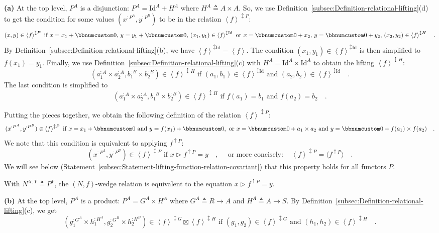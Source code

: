 \textbf{(a)} At the top level, $P^{A}$ is a disjunction: $P^{A}=\text{Id}^{A}+H^{A}$
where $H^{A}\triangleq A\times A$. So, we use Definition~\ref{subsec:Definition-relational-lifting}(d)
to get the condition for some values $(x^{:P^{A}},y^{:P^{B}})$ to
be in the relation $\left<f\right>^{\updownarrow P}$:
\[
(x,y)\in\left<f\right>^{\updownarrow P}\text{ if }x=x_{1}+\bbnum 0,\,y=y_{1}+\bbnum 0,\,(x_{1},y_{1})\in\left<f\right>^{\updownarrow\text{Id}}\text{ or }x=\bbnum 0+x_{2},\,y=\bbnum 0+y_{2},\,(x_{2},y_{2})\in\left<f\right>^{\updownarrow H}\quad.
\]
By Definition~\ref{subsec:Definition-relational-lifting}(b), we
have $\left<f\right>^{\updownarrow\text{Id}}=\left<f\right>$. The
condition $(x_{1},y_{1})\in\left<f\right>^{\updownarrow\text{Id}}$
is then simplified to $f(x_{1})=y_{1}$. Finally, we use Definition~\ref{subsec:Definition-relational-lifting}(c)
with $H^{A}=\text{Id}^{A}\times\text{Id}^{A}$ to obtain the lifting
$\left<f\right>^{\updownarrow H}$:
\[
(a_{1}^{:A}\times a_{2}^{:A},b_{1}^{:B}\times b_{2}^{:B})\in\left<f\right>^{\updownarrow H}\text{ if }(a_{1},b_{1})\in\left<f\right>^{\updownarrow\text{Id}}\text{ and }(a_{2},b_{2})\in\left<f\right>^{\updownarrow\text{Id}}\quad.
\]
The last condition is simplified to
\[
(a_{1}^{:A}\times a_{2}^{:A},b_{1}^{:B}\times b_{2}^{:B})\in\left<f\right>^{\updownarrow H}\text{ if }f(a_{1})=b_{1}\text{ and }f(a_{2})=b_{2}\quad.
\]

Putting the pieces together, we obtain the following definition of
the relation $\left<f\right>^{\updownarrow P}$:
\[
(x^{:P^{A}},y^{:P^{B}})\in\left<f\right>^{\updownarrow P}\text{ if }x=x_{1}+\bbnum 0\text{ and }y=f(x_{1})+\bbnum 0,\text{ or }x=\bbnum 0+a_{1}\times a_{2}\text{ and }y=\bbnum 0+f(a_{1})\times f(a_{2})\quad.
\]
We note that this condition is equivalent to applying $f^{\uparrow P}$:
\[
(x^{:P^{A}},y^{:P^{B}})\in\left<f\right>^{\updownarrow P}\text{ if }x\triangleright f^{\uparrow P}=y\quad,\quad\text{ or more concisely}:\quad\left<f\right>^{\updownarrow P}=\langle f^{\uparrow P}\rangle\quad.
\]
We will see below (Statement~\ref{subsec:Statement-lifting-function-relation-covariant})
that this property holds for all functors $P$.

With $N^{X,Y}\triangleq P^{Y}$, the $\left(N,f\right)$-wedge relation
is equivalent to the equation $x\triangleright f^{\uparrow P}=y$.

\textbf{(b)} At the top level, $P^{A}$ is a product: $P^{A}=G^{A}\times H^{A}$
where $G^{A}\triangleq R\rightarrow A$ and $H^{A}\triangleq A\rightarrow S$.
By Definition~\ref{subsec:Definition-relational-lifting}(c), we
get
\[
(g_{1}^{:G^{A}}\times h_{1}^{:H^{A}},g_{2}^{:G^{B}}\times h_{2}^{:H^{B}})\in\left<f\right>^{\updownarrow G}\boxtimes\left<f\right>^{\updownarrow H}\text{ if }(g_{1},g_{2})\in\left<f\right>^{\updownarrow G}\text{ and }(h_{1},h_{2})\in\left<f\right>^{\updownarrow H}\quad.
\]

